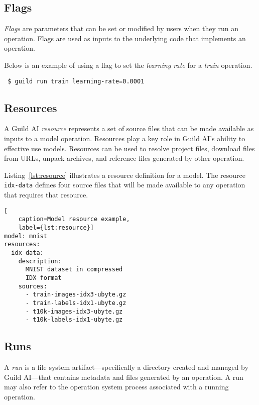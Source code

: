 \documentclass{article}
\begin{document}
\subsection{Flags}

\emph{Flags} are parameters that can be set or modified by users when
they run an operation. Flags are used as inputs to the underlying code
that implements an operation.

Below is an example of using a flag to set the \emph{learning rate}
for a \emph{train} operation.

{\footnotesize
\begin{verbatim}
 $ guild run train learning-rate=0.0001
\end{verbatim}}

\subsection{Resources}
\label{sec:resources}

A Guild AI \emph{resource} represents a set of source files that can
be made available as inputs to a model operation. Resources play a key
role in Guild AI's ability to effective use models. Resources can be
used to resolve project files, download files from URLs, unpack
archives, and reference files generated by other operation.

Listing~\ref{lst:resource} illustrates a resource definition for a
model. The resource \verb|idx-data| defines four source files that
will be made available to any operation that requires that resource.

\begin{lstlisting}[
    caption=Model resource example,
    label={lst:resource}]
model: mnist
resources:
  idx-data:
    description:
      MNIST dataset in compressed
      IDX format
    sources:
      - train-images-idx3-ubyte.gz
      - train-labels-idx1-ubyte.gz
      - t10k-images-idx3-ubyte.gz
      - t10k-labels-idx1-ubyte.gz
\end{lstlisting}

\subsection{Runs}

A \emph{run} is a file system artifact---specifically a directory
created and managed by Guild AI---that contains metadata and files
generated by an operation. A run may also refer to the operation
system process associated with a running operation.
\end{document}

